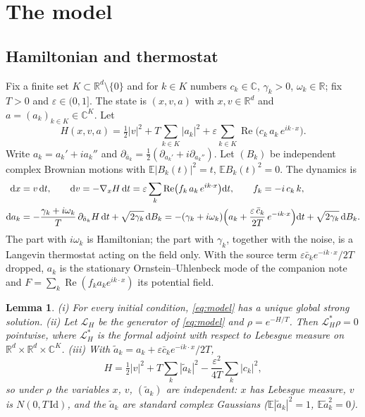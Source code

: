 \documentclass[11pt]{article}
\newcommand{\dd}{\mathrm{d}}
\newcommand{\E}{\mathbb{E}}
\newcommand{\eps}{\varepsilon}
\newcommand{\cL}{\mathcal{L}}
\renewcommand{\Re}{\operatorname{Re}}
\newtheorem{lemma}[theorem]{Lemma}
\theoremstyle{remark}
\begin{document}
\section{The model}

\subsection{Hamiltonian and thermostat}

Fix a finite set $K\subset\mathbb{R}^d\setminus\{0\}$ and for $k\in K$
numbers $c_k\in\mathbb{C}$, $\gamma_k>0$, $\omega_k\in\mathbb{R}$; fix $T>0$
and $\eps\in(0,1]$. The state is $(x,v,a)$ with $x,v\in\mathbb{R}^d$ and
$a=(a_k)_{k\in K}\in\mathbb{C}^K$. Let
\begin{equation}
  H(x,v,a)=\tfrac12|v|^2+T\sum_{k\in K}|a_k|^2
    +\eps\sum_{k\in K}\Re\bigl(c_k\,a_k\,e^{ik\cdot x}\bigr).
  \label{eq:H}
\end{equation}
Write $a_k=a_k'+ia_k''$ and
$\partial_{\bar a_k}=\tfrac12(\partial_{a_k'}+i\partial_{a_k''})$. Let
$(B_k)$ be independent complex Brownian motions with $\E|B_k(t)|^2=t$,
$\E B_k(t)^2=0$. The dynamics is
\begin{equation}
\begin{aligned}
  \dd x&=v\,\dd t,\qquad
  \dd v=-\nabla_xH\,\dd t
     =\eps\sum_k\Re\bigl(f_k\,a_k\,e^{ik\cdot x}\bigr)\dd t,
     \qquad f_k=-i\,c_k\,k,\\
  \dd a_k&=-\frac{\gamma_k+i\omega_k}{T}\,\partial_{\bar a_k}H\,\dd t
     +\sqrt{2\gamma_k}\,\dd B_k
   =-(\gamma_k+i\omega_k)\Bigl(a_k+\frac{\eps\,\bar c_k}{2T}\,e^{-ik\cdot x}\Bigr)\dd t
     +\sqrt{2\gamma_k}\,\dd B_k .
\end{aligned}
\label{eq:model}
\end{equation}
The part with $i\omega_k$ is Hamiltonian; the part with $\gamma_k$, together
with the noise, is a Langevin thermostat acting on the field only. With the
source term $\eps\bar c_ke^{-ik\cdot x}/2T$ dropped, $a_k$ is the stationary
Ornstein--Uhlenbeck mode of the companion note and
$F=\sum_k\Re(f_ka_ke^{ik\cdot x})$ its potential field.

\begin{lemma}\label{lem:gibbs}
\emph{(i)} For every initial condition, \eqref{eq:model} has a unique global
strong solution. \emph{(ii)} Let $\cL_H$ be the generator of
\eqref{eq:model} and $\rho=e^{-H/T}$. Then $\cL_H^*\rho=0$ pointwise, where
$\cL_H^*$ is the formal adjoint with respect to Lebesgue measure on
$\mathbb{R}^d\times\mathbb{R}^d\times\mathbb{C}^K$. \emph{(iii)} With
$\tilde a_k=a_k+\eps\bar c_ke^{-ik\cdot x}/2T$,
\begin{equation}
  H=\tfrac12|v|^2+T\sum_k|\tilde a_k|^2-\frac{\eps^2}{4T}\sum_k|c_k|^2 ,
  \label{eq:Hdressed}
\end{equation}
so under $\rho$ the variables $x$, $v$, $(\tilde a_k)$ are independent: $x$
has Lebesgue measure, $v$ is $N(0,T\,\mathrm{Id})$, and the $\tilde a_k$ are
standard complex Gaussians ($\E|\tilde a_k|^2=1$, $\E\tilde a_k^2=0$).
\end{lemma}
\end{document}
